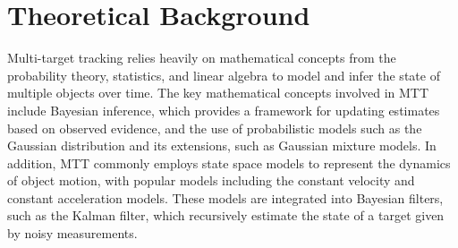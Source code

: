 \chapter{Theoretical Background}
Multi-target tracking relies heavily on mathematical concepts from the probability theory, statistics, and linear algebra to model and infer the state of multiple objects over time. The key mathematical concepts involved in MTT include Bayesian inference, which provides a framework for updating estimates based on observed evidence, and the use of probabilistic models such as the Gaussian distribution and its extensions, such as Gaussian mixture models. In addition, MTT commonly employs state space models to represent the dynamics of object motion, with popular models including the constant velocity and constant acceleration models. These models are integrated into Bayesian filters, such as the Kalman filter, which recursively estimate the state of a target given by noisy measurements.
